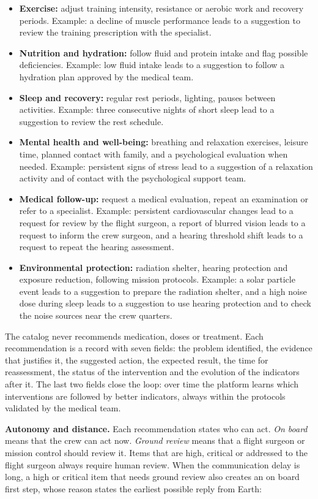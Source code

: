 \begin{itemize}
\item \textbf{Exercise:} adjust training intensity, resistance or aerobic work and recovery periods. Example: a decline of muscle performance leads to a suggestion to review the training prescription with the specialist.
\item \textbf{Nutrition and hydration:} follow fluid and protein intake and flag possible deficiencies. Example: low fluid intake leads to a suggestion to follow a hydration plan approved by the medical team.
\item \textbf{Sleep and recovery:} regular rest periods, lighting, pauses between activities. Example: three consecutive nights of short sleep lead to a suggestion to review the rest schedule.
\item \textbf{Mental health and well-being:} breathing and relaxation exercises, leisure time, planned contact with family, and a psychological evaluation when needed. Example: persistent signs of stress lead to a suggestion of a relaxation activity and of contact with the psychological support team.
\item \textbf{Medical follow-up:} request a medical evaluation, repeat an examination or refer to a specialist. Example: persistent cardiovascular changes lead to a request for review by the flight surgeon, a report of blurred vision leads to a request to inform the crew surgeon, and a hearing threshold shift leads to a request to repeat the hearing assessment.
\item \textbf{Environmental protection:} radiation shelter, hearing protection and exposure reduction, following mission protocols. Example: a solar particle event leads to a suggestion to prepare the radiation shelter, and a high noise dose during sleep leads to a suggestion to use hearing protection and to check the noise sources near the crew quarters.
\end{itemize}

The catalog never recommends medication, doses or treatment. Each recommendation is a record with seven fields: the problem identified, the evidence that justifies it, the suggested action, the expected result, the time for reassessment, the status of the intervention and the evolution of the indicators after it. The last two fields close the loop: over time the platform learns which interventions are followed by better indicators, always within the protocols validated by the medical team.

\medskip\noindent\textbf{Autonomy and distance.} Each recommendation states who can act. \textit{On board} means that the crew can act now. \textit{Ground review} means that a flight surgeon or mission control should review it. Items that are high, critical or addressed to the flight surgeon always require human review. When the communication delay is long, a high or critical item that needs ground review also creates an on board first step, whose reason states the earliest possible reply from Earth:

